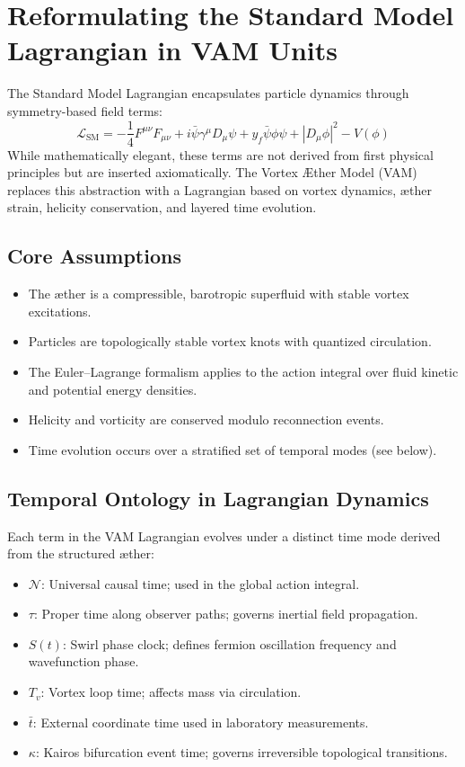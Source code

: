 \section{Reformulating the Standard Model Lagrangian in VAM Units}\label{sec:lagrangian_vam}

The Standard Model Lagrangian encapsulates particle dynamics through symmetry-based field terms:
\begin{equation}
    \mathcal{L}_{\text{SM}} = -\frac{1}{4}F^{\mu\nu}F_{\mu\nu} + i\bar{\psi}\gamma^\mu D_\mu \psi + y_f \bar{\psi}\phi \psi + |D_\mu \phi|^2 - V(\phi)
\end{equation}
While mathematically elegant, these terms are not derived from first physical principles but are inserted axiomatically. The Vortex \AE{}ther Model (VAM) replaces this abstraction with a Lagrangian based on vortex dynamics, \ae{}ther strain, helicity conservation, and layered time evolution.

\subsection{Core Assumptions}
\begin{itemize}
    \item The \ae{}ther is a compressible, barotropic superfluid with stable vortex excitations.
    \item Particles are topologically stable vortex knots with quantized circulation.
    \item The Euler--Lagrange formalism applies to the action integral over fluid kinetic and potential energy densities.
    \item Helicity and vorticity are conserved modulo reconnection events.
    \item Time evolution occurs over a stratified set of temporal modes (see below).
\end{itemize}

\subsection*{Temporal Ontology in Lagrangian Dynamics}
Each term in the VAM Lagrangian evolves under a distinct time mode derived from the structured \ae{}ther:

\begin{itemize}
    \item \( \mathcal{N} \): Universal causal time; used in the global action integral.
    \item \( \tau \): Proper time along observer paths; governs inertial field propagation.
    \item \( S(t) \): Swirl phase clock; defines fermion oscillation frequency and wavefunction phase.
    \item \( T_v \): Vortex loop time; affects mass via circulation.
    \item \( \bar{t} \): External coordinate time used in laboratory measurements.
    \item \( \kappa \): Kairos bifurcation event time; governs irreversible topological transitions.
\end{itemize}

